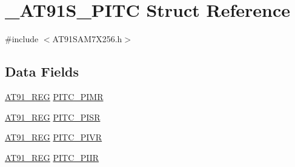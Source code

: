 \hypertarget{struct__AT91S__PITC}{\section{\-\_\-\-A\-T91\-S\-\_\-\-P\-I\-T\-C Struct Reference}
\label{struct__AT91S__PITC}
}


{\ttfamily \#include $<$A\-T91\-S\-A\-M7\-X256.\-h$>$}

\subsection*{Data Fields}
\begin{DoxyCompactItemize}
\item 
\hyperlink{GCC_2ARM7__AT91SAM7S_2AT91SAM7X256_8h_a712ad5a1ac1bd02f3e95a7526c283ce1}{A\-T91\-\_\-\-R\-E\-G} \hyperlink{struct__AT91S__PITC_ac8ca0d9ea40b6b1ae1da6b768f57f20e}{P\-I\-T\-C\-\_\-\-P\-I\-M\-R}
\item 
\hyperlink{GCC_2ARM7__AT91SAM7S_2AT91SAM7X256_8h_a712ad5a1ac1bd02f3e95a7526c283ce1}{A\-T91\-\_\-\-R\-E\-G} \hyperlink{struct__AT91S__PITC_a9818f43a89fa0c9107c9d1f7f7a1dda5}{P\-I\-T\-C\-\_\-\-P\-I\-S\-R}
\item 
\hyperlink{GCC_2ARM7__AT91SAM7S_2AT91SAM7X256_8h_a712ad5a1ac1bd02f3e95a7526c283ce1}{A\-T91\-\_\-\-R\-E\-G} \hyperlink{struct__AT91S__PITC_ad411b434088b85244317aed969575a84}{P\-I\-T\-C\-\_\-\-P\-I\-V\-R}
\item 
\hyperlink{GCC_2ARM7__AT91SAM7S_2AT91SAM7X256_8h_a712ad5a1ac1bd02f3e95a7526c283ce1}{A\-T91\-\_\-\-R\-E\-G} \hyperlink{struct__AT91S__PITC_ac663de20d192b5d2c7032bf2e1b663cb}{P\-I\-T\-C\-\_\-\-P\-I\-I\-R}
\end{DoxyCompactItemize}


